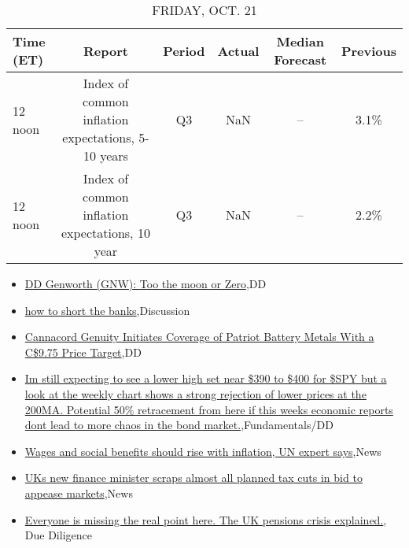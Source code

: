 \documentclass{article}%
\begin{document}
%


\begin{table}[htbp]%
\caption{FRIDAY, OCT. 21}%
\centering%
\begin{adjustbox}{width=1\textwidth}%
\begin{tabular}{lccccc}
\toprule
Time (ET) &                                             Report & Period & Actual & Median Forecast & Previous \\
\midrule
  12 noon & Index of common inflation expectations, 5-10 years &     Q3 &    NaN &              -- &     3.1\% \\
  12 noon &    Index of common inflation expectations, 10 year &     Q3 &    NaN &              -- &     2.2\% \\
\bottomrule
\end{tabular}
%
\end{adjustbox}%
\end{table}

%
\begin{itemize}%
\item%
\href{https://reddit.com/r/wallstreetbets/comments/y6afom/dd\_genworth\_gnw\_too\_the\_moon\_or\_zero/}{DD Genworth (GNW): Too the moon or Zero},DD%
\item%
\href{https://reddit.com/r/wallstreetbets/comments/y68vcn/how\_to\_short\_the\_banks/}{how to short the banks},Discussion%
\item%
\href{https://reddit.com/r/Baystreetbets/comments/y684b4/cannacord\_genuity\_initiates\_coverage\_of\_patriot/}{Cannacord Genuity Initiates Coverage of Patriot Battery Metals With a C\$9.75 Price Target},DD%
\item%
\href{https://reddit.com/r/StockMarket/comments/y6a40l/im\_still\_expecting\_to\_see\_a\_lower\_high\_set\_near/}{Im still expecting to see a lower high set near \$390 to \$400 for \$SPY but a look at the weekly chart shows a strong rejection of lower prices at the 200MA. Potential 50\% retracement from here if this weeks economic reports dont lead to more chaos in the bond market.},Fundamentals/DD%
\item%
\href{https://reddit.com/r/Economics/comments/y689lf/wages\_and\_social\_benefits\_should\_rise\_with/}{Wages and social benefits should rise with inflation, UN expert says},News%
\item%
\href{https://reddit.com/r/Economics/comments/y67kaj/uks\_new\_finance\_minister\_scraps\_almost\_all/}{UKs new finance minister scraps almost all planned tax cuts in bid to appease markets},News%
\item%
\href{https://reddit.com/r/Superstonk/comments/y6awmr/everyone\_is\_missing\_the\_real\_point\_here\_the\_uk/}{Everyone is missing the real point here. The UK pensions crisis explained.}, Due Diligence%
\end{itemize}%
\end{document}
